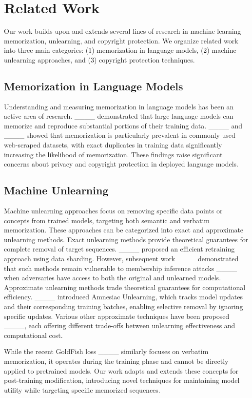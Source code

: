 \section{Related Work}
\label{sec:related}
Our work builds upon and extends several lines of research in machine learning memorization, unlearning, and copyright protection. We organize related work into three main categories: (1) memorization in language models, (2) machine unlearning approaches, and (3) copyright protection techniques.

\subsection{Memorization in Language Models}
Understanding and measuring memorization in language models has been an active area of research. ____ demonstrated that large language models can memorize and reproduce substantial portions of their training data. ____ and ____ showed that memorization is particularly prevalent in commonly used web-scraped datasets, with exact duplicates in training data significantly increasing the likelihood of memorization. These findings raise significant concerns about privacy and copyright protection in deployed language models.


\subsection{Machine Unlearning}
Machine unlearning approaches focus on removing specific data points or concepts from trained models, targeting both semantic and verbatim memorization. These approaches can be categorized into exact and approximate unlearning methods.
Exact unlearning methods provide theoretical guarantees for complete removal of target sequences. ____ proposed an efficient retraining approach using data sharding. However, subsequent work____ demonstrated that such methods remain vulnerable to membership inference attacks ____ when adversaries have access to both the original and unlearned models.
Approximate unlearning methods trade theoretical guarantees for computational efficiency. ____ introduced Amnesiac Unlearning, which tracks model updates and their corresponding training batches, enabling selective removal by ignoring specific updates. Various other approximate techniques have been proposed ____, each offering different trade-offs between unlearning effectiveness and computational cost.


While the recent GoldFish loss ____ similarly focuses on verbatim memorization, it operates during the training phase and cannot be directly applied to pretrained models. Our work adapts and extends these concepts for post-training modification, introducing novel techniques for maintaining model utility while targeting specific memorized sequences.


